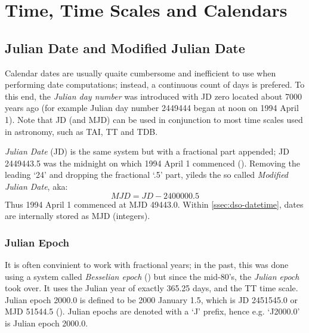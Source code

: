 \chapter{Time, Time Scales and Calendars}
\label{ch:time-scales}

\section{Julian Date and Modified Julian Date}
\label{sec:julian-date}
Calendar dates are usually quaite cumbersome and inefficient to use when 
performing date computations; instead, a continuous count of days is prefered. 
To this end, the \emph{Julian day number} was introduced with JD zero located 
about 7000 years ago (for example Julian day number 2449444 began at noon on 
1994 April 1). Note that JD (and MJD) can be used in conjunction to most 
time scales used in astronomy, such as TAI, TT and TDB.

\emph{Julian Date} (JD) is the same system but with a fractional part appended; JD 2449443.5 was the
midnight on which 1994 April 1 commenced (\cite{SOFA20210125}). Removing the leading 
`24' and dropping the fractional `.5' part, yileds the so called \emph{Modified Julian Date}, 
aka:
\begin{equation}
    MJD = JD - 2400000.5
\end{equation}
Thus 1994 April 1 commenced at MJD 49443.0. Within \ref{ssec:dso-datetime}, dates are 
internally stored as MJD (integers).

\subsection{Julian Epoch}
It is often convinient to work with fractional years; in the past, this was done 
using a system called \emph{Besselian epoch} (\cite{SOFA20210125}) but since the 
mid-80's, the \emph{Julian epoch} took over. It uses the Julian year of exactly 365.25 days,
and the TT time scale. Julian epoch 2000.0 is defined to be 2000 January 1.5, which
is JD 2451545.0 or MJD 51544.5 (\cite{SOFA20210125}). Julian epochs are denoted with 
a `J' prefix, hence e.g. `J2000.0' is Julian epoch 2000.0.

